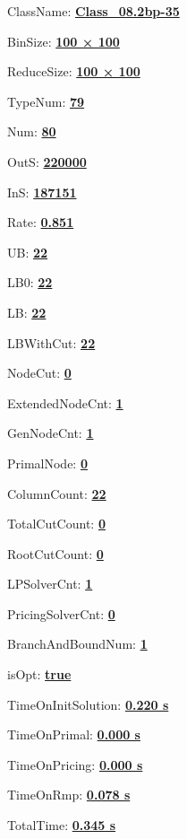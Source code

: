 \documentclass[11pt]{article}
\begin{document}
\pagestyle{empty}


ClassName: \underline{\textbf{Class_08.2bp-35}}
\par
BinSize: \underline{\textbf{100 × 100}}
\par
ReduceSize: \underline{\textbf{100 × 100}}
\par
TypeNum: \underline{\textbf{79}}
\par
Num: \underline{\textbf{80}}
\par
OutS: \underline{\textbf{220000}}
\par
InS: \underline{\textbf{187151}}
\par
Rate: \underline{\textbf{0.851}}
\par
UB: \underline{\textbf{22}}
\par
LB0: \underline{\textbf{22}}
\par
LB: \underline{\textbf{22}}
\par
LBWithCut: \underline{\textbf{22}}
\par
NodeCut: \underline{\textbf{0}}
\par
ExtendedNodeCnt: \underline{\textbf{1}}
\par
GenNodeCnt: \underline{\textbf{1}}
\par
PrimalNode: \underline{\textbf{0}}
\par
ColumnCount: \underline{\textbf{22}}
\par
TotalCutCount: \underline{\textbf{0}}
\par
RootCutCount: \underline{\textbf{0}}
\par
LPSolverCnt: \underline{\textbf{1}}
\par
PricingSolverCnt: \underline{\textbf{0}}
\par
BranchAndBoundNum: \underline{\textbf{1}}
\par
isOpt: \underline{\textbf{true}}
\par
TimeOnInitSolution: \underline{\textbf{0.220 s}}
\par
TimeOnPrimal: \underline{\textbf{0.000 s}}
\par
TimeOnPricing: \underline{\textbf{0.000 s}}
\par
TimeOnRmp: \underline{\textbf{0.078 s}}
\par
TotalTime: \underline{\textbf{0.345 s}}
\par
\newpage


\end{document}

